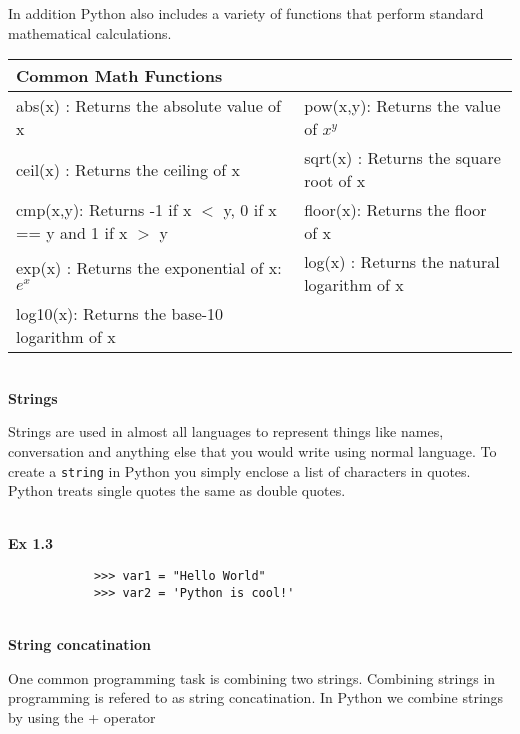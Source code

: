 \documentclass[letterpaper,11pt]{article}
\begin{document}
\par{In addition Python also includes a variety of functions that perform
standard mathematical calculations.}
\\
\begin{tabular}[t]{l  l}
    \textbf{Common Math Functions} & \\
    \hline
    abs(x)  : Returns the absolute value of x                     & pow(x,y): Returns the value of $x^y$         \\
    ceil(x) : Returns the ceiling of x                            & sqrt(x) : Returns the square root of x       \\
    cmp(x,y): Returns -1 if x $<$ y, 0 if x == y and 1 if x $>$ y & floor(x): Returns the floor of x             \\
    exp(x)  : Returns the exponential of x: $e^x$                 & log(x)  : Returns the natural logarithm of x \\
    log10(x): Returns the base-10 logarithm of x                  &                                              \\
\end{tabular}
\\
\textbf{Strings}
\\
\par{Strings are used in almost all languages to represent things like names,
conversation and anything else that you would write using normal language. To
create a \texttt{string} in Python you simply enclose a list of characters in
quotes. Python treats single quotes the same as double quotes.}
\\ \\
\begin{minipage}{.5\textwidth}
    \small \textbf{Ex 1.3}
    \begin{tcolorbox}
        \begin{footnotesize}
            \begin{verbatim}
            >>> var1 = "Hello World"
            >>> var2 = 'Python is cool!'
            \end{verbatim}
        \end{footnotesize}
    \end{tcolorbox}
\end{minipage}
\\
\textbf{String concatination}
\\
\par{One common programming task is combining two strings. Combining strings in
    programming is refered to as string concatination. In Python we combine
strings by using the + operator}
\end{document}

